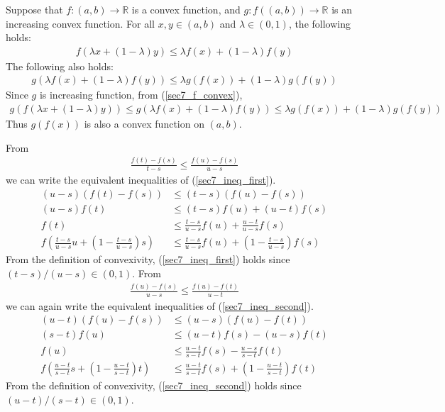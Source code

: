 \documentclass{scrartcl}
\begin{document}
Suppose that \(f : (a, b) \to \mathbb{R}\) is a convex function, and \(g : f((a, b)) \to \mathbb{R}\) is an increasing convex function.
For all \(x, y \in (a, b)\) and \(\lambda \in (0, 1)\), the following holds:
\begin{align}\label{sec7_f_convex}
  f(\lambda x + (1 - \lambda) y) \leq \lambda f(x) + (1 - \lambda) f(y)
\end{align}
The following also holds:
\begin{align*}
  g(\lambda f(x) + (1 - \lambda) f(y)) \leq \lambda g(f(x)) + (1 - \lambda) g(f(y))
\end{align*}
Since \(g\) is increasing function, from (\ref{sec7_f_convex}),
\begin{align*}
  g(f(\lambda x + (1 - \lambda) y)) \leq g(\lambda f(x) + (1 - \lambda) f(y)) \leq \lambda g(f(x)) + (1 - \lambda) g(f(y))
\end{align*}
Thus \(g(f(x))\) is also a convex function on \((a, b)\).

From
\begin{align}\label{sec7_ineq_first}
  \frac{f(t) - f(s)}{t - s} \leq \frac{f(u) - f(s)}{u - s}
\end{align}
we can write the equivalent inequalities of (\ref{sec7_ineq_first}).
\begin{align*}
  (u - s)(f(t) - f(s)) &\leq (t - s)(f(u) - f(s)) \\
  (u - s)f(t) &\leq (t - s)f(u) + (u - t)f(s) \\
  f(t) &\leq \frac{t - s}{u - s} f(u) + \frac{u - t}{u - s} f(s) \\
  f \left( \frac{t - s}{u - s} u + \left( 1 - \frac{t - s}{u - s} \right) s \right) &\leq \frac{t - s}{u - s} f(u) + \left( 1 - \frac{t - s}{u - s} \right) f(s)
\end{align*}
From the definition of convexivity, (\ref{sec7_ineq_first}) holds since \((t - s) / (u - s) \in (0, 1)\).
From
\begin{align}\label{sec7_ineq_second}
  \frac{f(u) - f(s)}{u - s} \leq \frac{f(u) - f(t)}{u - t}
\end{align}
we can again write the equivalent inequalities of (\ref{sec7_ineq_second}).
\begin{align*}
  (u - t)(f(u) - f(s)) &\leq (u - s)(f(u) - f(t)) \\
  (s - t)f(u) &\leq (u - t)f(s) - (u - s)f(t) \\
  f(u) &\leq \frac{u - t}{s - t}f(s) - \frac{u - s}{s - t}f(t) \\
  f \left( \frac{u - t}{s - t} s + \left( 1 - \frac{u - t}{s - t} \right) t \right) &\leq \frac{u - t}{s - t}f(s) + \left( 1 - \frac{u - t}{s - t} \right) f(t)
\end{align*}
From the definition of convexivity, (\ref{sec7_ineq_second}) holds since \((u - t) / (s - t) \in (0, 1)\).
\end{document}
